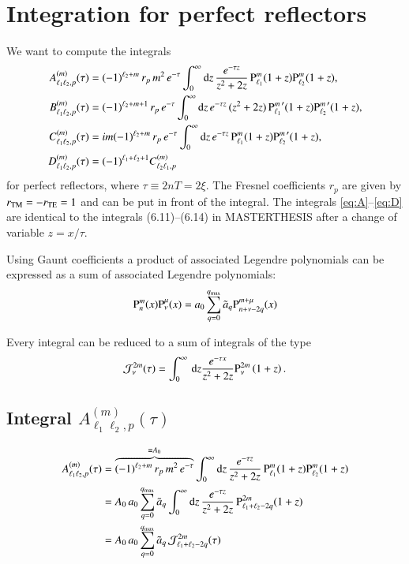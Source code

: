 



\chapter{Integration for perfect reflectors}

We want to compute the integrals
\begin{align}
\label{eq:A}
A_{\ell_1\ell_2,p}^{(m)}(\tau) &= (-1)^{\ell_2+m} \, r_p \, m^2 \, e^{-\tau} \int_0^\infty \mathrm{d}z \, \frac{e^{-\tau z}}{z^2+2z} \, {\text{P}_{\ell_1}^{m}}(1+z) {\text{P}_{\ell_2}^{m}}(1+z), \\
\label{eq:B}
B_{\ell_1\ell_2,p}^{(m)}(\tau) &= (-1)^{\ell_2+m+1} \, r_p \, e^{-\tau} \int_0^\infty \mathrm{d}z \, e^{-\tau z} \, (z^2+2z) \, {\text{P}_{\ell_1}^{m}}^\prime(1+z) {\text{P}_{\ell_2}^{m}}^\prime(1+z), \\
\label{eq:C}
C_{\ell_1\ell_2,p}^{(m)}(\tau) &= i m (-1)^{\ell_2+m} \, r_p \, e^{-\tau} \int_0^\infty \mathrm{d}z \, e^{-\tau z} \, {\text{P}_{\ell_1}^{m}}(1+z) {\text{P}_{\ell_2}^{m}}^\prime(1+z), \\
\label{eq:D}
D_{\ell_1\ell_2,p}^{(m)}(\tau) &= (-1)^{\ell_1+\ell_2+1} C_{\ell_2\ell_1,p}^{(m)}
\end{align}
for perfect reflectors, where $\tau \equiv 2nT=2\xi$. The Fresnel coefficients
$r_p$ are given by $r_{\mathrm{TM}}=-r_{\mathrm{TE}}=1$ and can be put in front of the integral. 
The integrals \eqref{eq:A}--\eqref{eq:D} are identical to the integrals (6.11)--(6.14)
in MASTERTHESIS after a change of variable $z = x/\tau$.

Using Gaunt coefficients a product of associated Legendre polynomials can be
expressed as a sum of associated Legendre polynomials:
\begin{equation}
{\text{P}_{n}^{m}}(x) {\text{P}_{\nu}^{\mu}}(x) = a_0 \sum_{q=0}^{q_\text{max}} \tilde a_q  {\text{P}_{n+\nu-2q}^{m+\mu}}(x)
\end{equation}

Every integral can be reduced to a sum of integrals of the type
\begin{equation}
\mathcal{J}_\nu^{2m}(\tau) = \int_0^\infty \, \mathrm{d}z \frac{e^{-\tau x}}{z^2+2z} {\text{P}_{\nu}^{2m}}\left(1+z\right).
\end{equation}


\section{Integral $A_{\ell_1\ell_2,p}^{(m)}(\tau)$}

\begin{align}
\nonumber
A_{\ell_1\ell_2,p}^{(m)}(\tau) &= \overbrace{(-1)^{\ell_2+m} \, r_p \, m^2 \, e^{-\tau}}^{\equiv A_0} \int_0^\infty \mathrm{d}z \, \frac{e^{-\tau z}}{z^2+2z} \, {\text{P}_{\ell_1}^{m}}(1+z) {\text{P}_{\ell_2}^{m}}(1+z) \\
\nonumber
&= A_0 \, a_0 \sum_{q=0}^{q_\text{max}} \tilde a_q \int_0^\infty \mathrm{d}z \, \frac{e^{-\tau z}}{z^2+2z} \, {\text{P}_{\ell_1+\ell_2-2q}^{2m}}(1+z) \\
&= A_0 \, a_0 \sum_{q=0}^{q_\text{max}} \tilde a_q \, \mathcal{J}_{\ell_1+\ell_2-2q}^{2m}(\tau)
\end{align}


